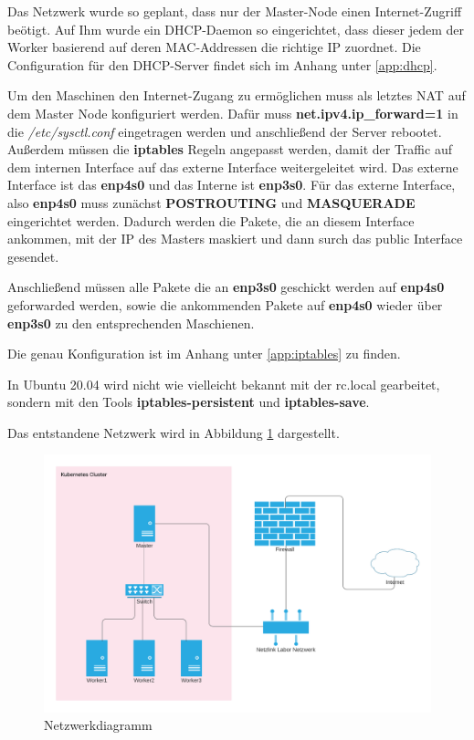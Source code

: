 Das Netzwerk wurde so geplant, dass nur der Master-Node einen Internet-Zugriff beötigt.
Auf Ihm wurde ein \ac{DHCP}-Daemon so eingerichtet, dass dieser jedem der Worker basierend auf deren \ac{MAC}-Addressen die richtige IP zuordnet. 
Die Configuration für den \ac{DHCP}-Server findet sich im Anhang unter \ref{app:dhcp}. 

Um den Maschinen den Internet-Zugang zu ermöglichen muss als letztes \ac{NAT} auf dem Master Node konfiguriert werden.
Dafür muss \textbf{net.ipv4.ip\_forward=1} in die \textit{/etc/sysctl.conf} eingetragen werden und anschließend der Server rebootet.
Außerdem müssen die \textbf{iptables} Regeln angepasst werden, damit der Traffic auf dem internen Interface auf das externe Interface weitergeleitet wird. 
Das externe Interface ist das \textbf{enp4s0} und das Interne ist \textbf{enp3s0}.
Für das externe Interface, also \textbf{enp4s0} muss zunächst \textbf{POSTROUTING} und \textbf{MASQUERADE} eingerichtet werden. 
Dadurch werden die Pakete, die an diesem Interface ankommen, mit der IP des Masters maskiert und dann surch das public Interface gesendet. 

Anschließend müssen alle Pakete die an \textbf{enp3s0} geschickt werden auf \textbf{enp4s0} geforwarded werden, sowie die ankommenden Pakete auf \textbf{enp4s0} wieder über \textbf{enp3s0} zu den entsprechenden Maschienen.

Die genau Konfiguration ist im Anhang unter \ref{app:iptables} zu finden. 

In Ubuntu 20.04 wird nicht wie vielleicht bekannt mit der rc.local gearbeitet, sondern mit den Tools \textbf{iptables-persistent} und \textbf{iptables-save}.

Das entstandene Netzwerk wird in Abbildung \ref{fig:network_diagramm} dargestellt.

\begin{figure}[h]
    \centering
    \includegraphics[width=\textwidth]{bilder/Katanetes Network.png}
    \caption{Netzwerkdiagramm}
    \label{fig:network_diagramm}
\end{figure}

